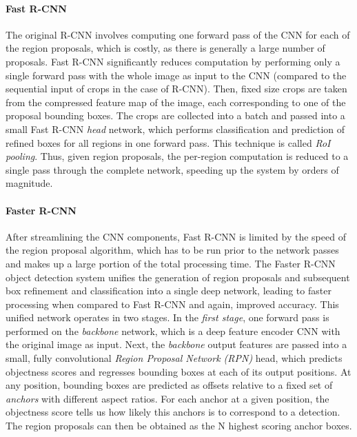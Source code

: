 \paragraph{Fast R-CNN}
The original R-CNN involves computing one forward pass of the CNN for each of the region proposals,
which is costly, as there is generally a large number of proposals.
Fast R-CNN \cite{FastRCNN} significantly reduces computation by performing only a single forward pass with the whole image
as input to the CNN (compared to the sequential input of crops in the case of R-CNN).
Then, fixed size crops are taken from the compressed feature map of the image,
each corresponding to one of the proposal bounding boxes.
The crops are collected into a batch and passed into a small Fast R-CNN
\emph{head} network, which performs classification and prediction of refined boxes for all regions in one forward pass.
This technique is called \emph{RoI pooling}. %
Thus, given region proposals, the per-region computation is reduced to a single pass through the complete network,
speeding up the system by orders of magnitude. %

\paragraph{Faster R-CNN}
After streamlining the CNN components, Fast R-CNN is limited by the speed of the region proposal
algorithm, which has to be run prior to the network passes and makes up a large portion of the total
processing time.
The Faster R-CNN object detection system \cite{FasterRCNN} unifies the generation of region proposals and subsequent box refinement and
classification into a single deep network, leading to faster processing when compared to Fast R-CNN
and again, improved accuracy.
This unified network operates in two stages.
In the \emph{first stage}, one forward pass is performed on the \emph{backbone} network,
which is a deep feature encoder CNN with the original image as input.
Next, the \emph{backbone} output features are passed into a small, fully convolutional \emph{Region Proposal Network (RPN)} head, which
predicts objectness scores and regresses bounding boxes at each of its output positions.
At any position, bounding boxes are predicted as offsets relative to a fixed set of \emph{anchors} with different
aspect ratios.
For each anchor at a given position, the objectness score tells us how likely this anchors is to correspond to a detection.
The region proposals can then be obtained as the N highest scoring anchor boxes.

